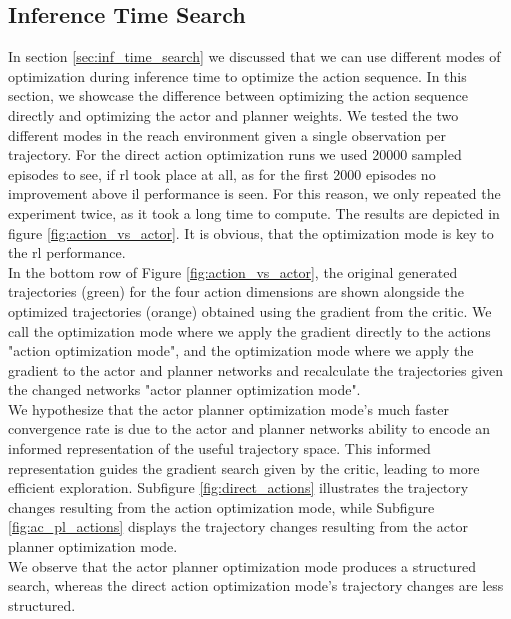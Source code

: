 \subsection{Inference Time Search}
\label{ref:com_opt_modes}
In section \ref{sec:inf_time_search} we discussed that we can use different modes of optimization during inference time to optimize the action sequence. In this section, 
we showcase the difference between optimizing the action sequence directly and optimizing the actor and planner weights. We tested the two different 
modes in the reach environment given a single observation per trajectory. For the direct 
action optimization runs we used 20000 sampled episodes to see, if \ac{rl} took place at all, as for the first 2000 episodes no improvement above 
\ac{il} performance is seen. For this reason, we only repeated the experiment twice, as it took a long time to compute. The results are depicted in figure 
\ref{fig:action_vs_actor}. It is obvious, that the optimization mode is key to the \ac{rl} performance. \\

In the bottom row of Figure \ref{fig:action_vs_actor}, the original generated trajectories (green) for the four action dimensions 
are shown alongside the optimized trajectories (orange) obtained using the gradient from the critic. We call the optimization mode 
where we apply the gradient directly to the actions "action optimization mode", and the optimization mode where we apply 
the gradient to the actor and planner networks and recalculate the trajectories given the changed networks "actor planner 
optimization mode".\\

We hypothesize that 
the actor planner optimization mode's much faster convergence rate is due to the actor and planner networks ability to 
encode an informed representation of the useful trajectory space. This informed representation guides the gradient search 
given by the critic, leading to more efficient exploration. Subfigure \ref{fig:direct_actions} illustrates the trajectory 
changes resulting from the action optimization mode, while Subfigure \ref{fig:ac_pl_actions} displays 
the trajectory changes resulting from the actor planner optimization mode. \\

We observe that the actor planner 
optimization mode produces a structured search, whereas the direct action optimization mode's trajectory changes are less structured.\\

